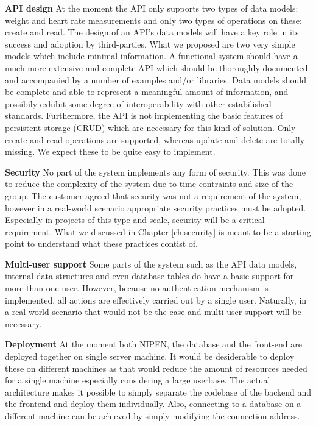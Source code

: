 \textbf{API design}\newline
At the moment the API only supports two types of data models: weight and heart rate measurements
and only two types of operations on these: create and read.
The design of an API's data models will have a key role in its success and adoption by
third-parties. What we proposed are two very simple models which include minimal information.
A functional system should have a much more extensive and complete API
which should be thoroughly documented and accompanied by a number of examples and/or libraries.
Data models should be complete and able to represent a meaningful amount of information,
and possibily exhibit some degree of interoperability with other estabilished standards.
Furthermore, the API is not implementing the basic features of persistent storage (CRUD)
which are necessary for this kind of solution. Only create and read operations are supported,
whereas update and delete are totally missing. We expect these to be quite easy to implement.

\textbf{Security}\newline
No part of the system implements any form of security.
This was done to reduce the complexity of the system due to time contraints and size of the group.
The customer agreed that security was not a requirement of the system, however in a real-world scenario
appropriate security practices must be adopted.
Especially in projects of this type and scale, security will be a critical requirement.
What we discussed in Chapter \ref{ch:security} is meant to be a starting point to understand
what these practices contist of.

\textbf{Multi-user support}\newline
Some parts of the system such as the API data models, internal data structures and even
database tables do have a basic support for more than one user. However, because no authentication
mechanism is implemented, all actions are effectively carried out by a single user.
Naturally, in a real-world scenario that would not be the case and multi-user support will
be necessary.

\textbf{Deployment}\newline
At the moment both NIPEN, the database and the front-end are deployed together on single server machine.
It would be desiderable to deploy these on different machines as that would reduce
the amount of resources needed for a single machine especially considering a large userbase.
The actual architecture makes it possible to simply separate the codebase of the backend and the frontend
and deploy them individually. Also, connecting to a database on a different machine can be
achieved by simply modifying the connection address.




